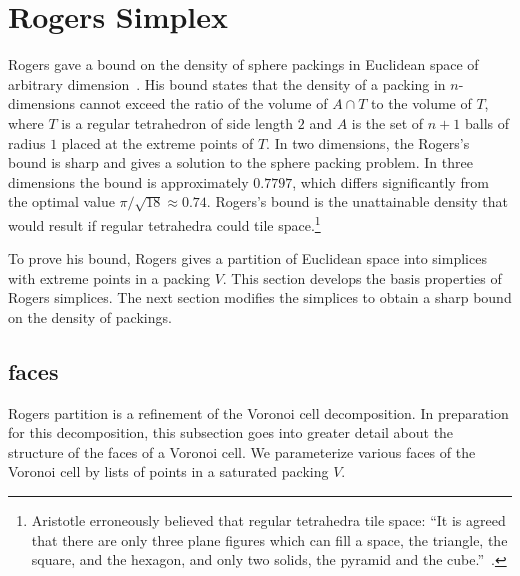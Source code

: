\section{Rogers Simplex}\label{sec:rogers}




Rogers gave a bound on the density of sphere packings in Euclidean
space of arbitrary dimension~\cite{Rogers:1958:Packing}.  His bound
states that the density of a packing in $n$-dimensions cannot exceed
the ratio of the volume of $A \cap T$ to the volume of $T$, where $T$
is a regular tetrahedron of side length $2$ and $A$ is the set of
$n+1$ balls of radius $1$ placed at the extreme points of $T$.  In two
dimensions, the Rogers's bound is sharp and gives a solution to the
sphere packing problem.  In three dimensions the bound is
approximately $0.7797$, which differs significantly from the optimal
value $\pi/\sqrt{18}\approx 0.74$.  Rogers's bound is the unattainable
density that would result if regular tetrahedra could tile
space.\footnote{Aristotle erroneously believed that regular tetrahedra
  tile space: ``It is agreed that there are only three plane figures
  which can fill a space, the triangle, the square, and the hexagon,
  and only two solids, the pyramid and the cube.''~\cite{Aristotle}.}

To prove his bound, Rogers gives a partition of Euclidean space into
simplices with extreme points in a packing $V$.  This section develops
the basis properties of Rogers simplices.  The next section modifies
the simplices to obtain a sharp bound on the density of packings.




\subsection{faces}

Rogers partition is a refinement of the Voronoi cell decomposition.
In preparation for this decomposition, this subsection goes into
greater detail about the structure of the faces of a Voronoi cell.  We
parameterize various faces of the Voronoi cell by lists of points in a
saturated packing $V$.

